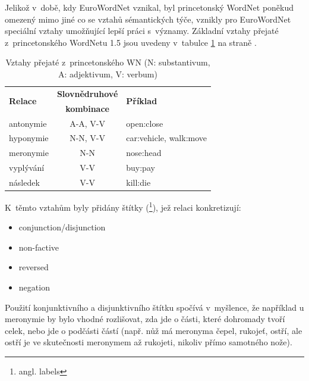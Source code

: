 \documentclass[a4paper, 11pt, oneside, showtrims]{book}
\newcommand\ex{\textsf}
\begin{document}
				Jelikož v~době, kdy EuroWordNet vznikal, byl princetonský WordNet poněkud omezený mimo jiné co se vztahů sémantických týče, vznikly pro EuroWordNet speciální vztahy umožňující lepší práci s~významy. Základní vztahy přejaté z~princetonského WordNetu 1.5 jsou uvedeny v~tabulce \ref{tab:wn-rels} na straně \pageref{tab:wn-rels}.

				\begin{table}[t]
					\centering
					\label{tab:wn-rels}
					\begin{tabular}{l c l}
					\multirow{ 2}{*}{\textbf{Relace}}       & \textbf{Slovnědruhové} & \multirow{ 2}{*}{\textbf{Příklad}}        \\
					                               & \textbf{kombinace}     &                                  \\ \hline
					antonymie                      & A-A, V-V      & \ex{open:close}                  \\ \hline
					hyponymie                      & N-N, V-V      & \ex{car:vehicle}, \ex{walk:move} \\ \hline
					meronymie                      & N-N           & \ex{nose:head}                   \\ \hline
					vyplývání\protect\footnotemark & V-V           & \ex{buy:pay}                     \\ \hline
					následek                       & V-V           & \ex{kill:die}               
					\end{tabular}
					\caption{Vztahy přejaté z~princetonského WN (N: substantivum, A: adjektivum, V: verbum)}
				\end{table}


				K~těmto vztahům byly přidány štítky (\footnote{angl. labels}), jež relaci konkretizují:

				\begin{itemize}
					\item conjunction/disjunction
					\item non-factive
					\item reversed
					\item negation
				\end{itemize}

				Použití konjunktivního a disjunktivního štítku spočívá v~myšlence, že například u meronymie by bylo vhodné rozlišovat, zda jde o části, které dohromady tvoří celek, nebo jde o podčásti částí (např. \ex{nůž} má meronyma \ex{čepel}, \ex{rukojeť}, \ex{ostří}, ale \ex{ostří} je ve skutečnosti meronymem až \ex{rukojeti}, nikoliv přímo samotného \ex{nože}).
\end{document}
